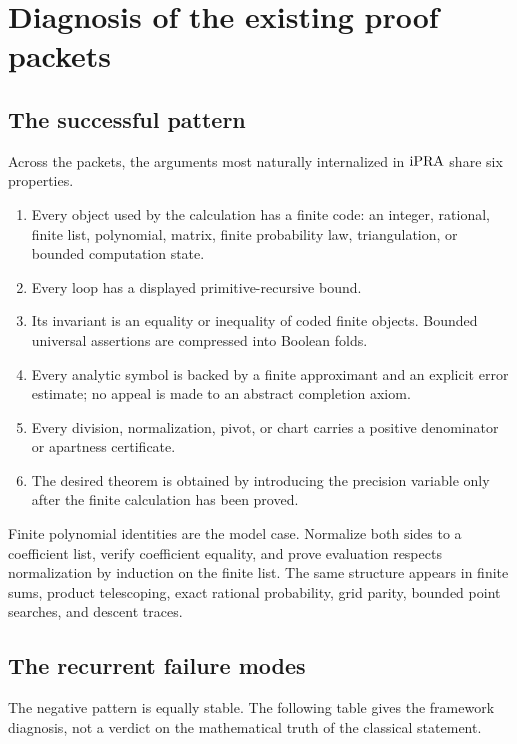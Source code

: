 \section{Diagnosis of the existing proof packets}
\label{sec:diagnosis}

\subsection{The successful pattern}

Across the packets, the arguments most naturally internalized in \(\mathrm{iPRA}\)
share six properties.

\begin{enumerate}
\item Every object used by the calculation has a finite code: an integer,
      rational, finite list, polynomial, matrix, finite probability law,
      triangulation, or bounded computation state.
\item Every loop has a displayed primitive-recursive bound.
\item Its invariant is an equality or inequality of coded finite objects.
      Bounded universal assertions are compressed into Boolean folds.
\item Every analytic symbol is backed by a finite approximant and an explicit
      error estimate; no appeal is made to an abstract completion axiom.
\item Every division, normalization, pivot, or chart carries a positive
      denominator or apartness certificate.
\item The desired theorem is obtained by introducing the precision variable
      only after the finite calculation has been proved.
\end{enumerate}

Finite polynomial identities are the model case.  Normalize both sides to a
coefficient list, verify coefficient equality, and prove evaluation respects
normalization by induction on the finite list.  The same structure appears in
finite sums, product telescoping, exact rational probability, grid parity,
bounded point searches, and descent traces.

\subsection{The recurrent failure modes}

The negative pattern is equally stable.  The following table gives the
framework diagnosis, not a verdict on the mathematical truth of the classical
statement.

